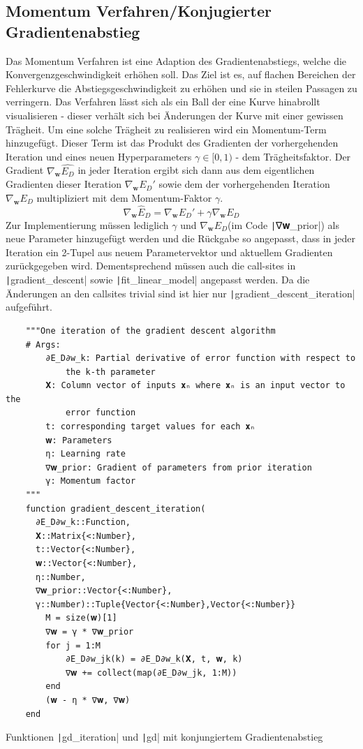 \documentclass{article}
\theoremstyle{plain} %
\theoremstyle{definition} %
\begin{document}
\subsection{Momentum Verfahren/Konjugierter Gradientenabstieg}
Das Momentum Verfahren ist eine Adaption des Gradientenabstiegs, welche die Konvergenzgeschwindigkeit erhöhen soll. Das Ziel ist es, auf flachen Bereichen der Fehlerkurve die Abstiegsgeschwindigkeit zu erhöhen und sie in steilen Passagen zu verringern. Das Verfahren lässt sich als ein Ball der eine Kurve hinabrollt visualisieren - dieser verhält sich bei Änderungen der Kurve mit einer gewissen Trägheit.
Um eine solche Trägheit zu realisieren wird ein Momentum-Term hinzugefügt. Dieser Term ist das Produkt des Gradienten der vorhergehenden Iteration und eines neuen Hyperparameters $\gamma \in [0,1)$ - dem Trägheitsfaktor. Der Gradient $\nabla_\mathbf{w}\hat{E_D}$ in jeder Iteration ergibt sich dann aus dem eigentlichen Gradienten dieser Iteration $\nabla_\mathbf{w} E_D'$ sowie dem der vorhergehenden Iteration $\nabla_\mathbf{w} E_D$ multipliziert mit dem Momentum-Faktor $\gamma$.
$$
  \nabla_\mathbf{w} \hat{E}_D = \nabla_\mathbf{w} E_D' + \gamma \nabla_\mathbf{w} E_D
$$
Zur Implementierung müssen lediglich $\gamma$ und $\nabla_\mathbf{w} E_D$(im Code \texttt|∇𝐰_prior|) als neue Parameter hinzugefügt werden und die Rückgabe so angepasst, dass in jeder Iteration ein 2-Tupel aus neuem Parametervektor und aktuellem Gradienten zurückgegeben wird. Dementsprechend müssen auch die call-sites in \texttt|gradient_descent| sowie \texttt|fit_linear_model| angepasst werden. Da die Änderungen an den callsites trivial sind ist hier nur \texttt|gradient_descent_iteration| aufgeführt.

\begin{listing}[H]
  \begin{verbatim}
    """One iteration of the gradient descent algorithm
    # Args:
        ∂E_D∂w_k: Partial derivative of error function with respect to
            the k-th parameter
        𝐗: Column vector of inputs 𝐱ₙ where 𝐱ₙ is an input vector to the
            error function
        t: corresponding target values for each 𝐱ₙ
        𝐰: Parameters
        η: Learning rate
        ∇𝐰_prior: Gradient of parameters from prior iteration
        γ: Momentum factor
    """
    function gradient_descent_iteration(
      ∂E_D∂w_k::Function,
      𝐗::Matrix{<:Number},
      t::Vector{<:Number},
      𝐰::Vector{<:Number},
      η::Number,
      ∇𝐰_prior::Vector{<:Number},
      γ::Number)::Tuple{Vector{<:Number},Vector{<:Number}}
        M = size(𝐰)[1]
        ∇𝐰 = γ * ∇𝐰_prior
        for j = 1:M
            ∂E_D∂w_jk(k) = ∂E_D∂w_k(𝐗, t, 𝐰, k)
            ∇𝐰 += collect(map(∂E_D∂w_jk, 1:M))
        end
        (𝐰 - η * ∇𝐰, ∇𝐰)
    end
  \end{verbatim}
  \caption{Funktionen \texttt|gd_iteration| und \texttt|gd| mit konjungiertem Gradientenabstieg}
  \label{listing:momentum}
\end{listing}
\end{document}
